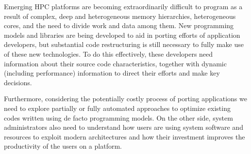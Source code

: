 Emerging HPC platforms are becoming extraordinarily difficult to program as a result of complex, deep and heterogeneous memory hierarchies, heterogeneous cores, and the need to divide work and data among them.
New programming models and libraries are being developed to aid in porting efforts of application developers, but substantial code restructuring is still necessary to fully make use of these new technologies.
To do this effectively, these developers need information about their source code characteristics, together with dynamic (including performance) information to direct their efforts and make key decisions.



Furthermore, considering the potentially costly process of porting applications we need to explore partially or fully automated approaches to optimize existing codes written using de facto programming models.
On the other side, system administrators also need to understand how users are using system software and resources to exploit modern architectures and how their investment improves the productivity of the users on a platform. 

